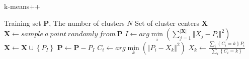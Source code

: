 \begin{itemize}
\end{itemize}

\begin{algorithm}
    \caption{k-means++}
    \label{kmeans}
    \begin{algorithmic}[1] 
       \Require Training set $\bm{P}$, The number of clusters $N$
       \Ensure Set of cluster centers $\bm{X}$
           \State $\bm{X} \gets sample \ a \ point \ randomly \ from \ \bm{P}$
                   \State $I \gets arg\min \limits_{i}\left({\sum_{j=1}^{\vert \bm{X} \vert} {\Vert X_j - P_i \Vert}^2  }\right)$
                   \State $\bm{X} \gets \bm{X} \cup \left\{ P_I \right\}$
                   \State $\bm{P} \gets \bm{P} - P_I$
               \EndFor
           \EndWhile
           \State {}
       \EndFunction
       \State
      \State $C_i \gets arg\min \limits_{k}{\left( {\Vert P_i - X_k\Vert} ^2\right)}$
               \EndFor
      \State $X_k \gets \frac{\sum_{i}{\left\{C_i=k\right\}P_i}}{\sum_{i}{\left\{C_i=k\right\}}}$
               \EndFor
           \EndWhile
           \State {}
       \EndFunction
\end{algorithmic}
\end{algorithm}

